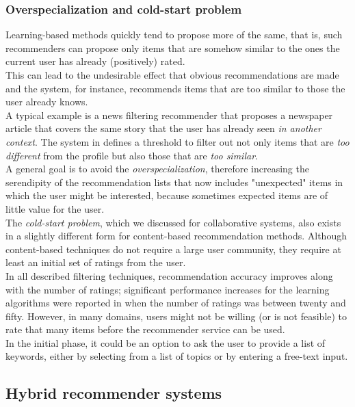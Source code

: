 \subsubsection{Overspecialization and cold-start problem}\label{overspecialization}

Learning-based methods quickly tend to propose more of the same, that
is, such recommenders can propose only items that are somehow similar
to the ones the current user has already (positively) rated. \\ This can
lead to the undesirable effect that obvious recommendations are made
and the system, for instance, recommends items that are too similar to
those the user already knows.\\ A typical example is a news filtering
recommender that proposes a newspaper article that covers the same
story that the user has already seen \textit{in another context}. The
system in \cite{billsus1999personal} defines a threshold to filter
out not only items that are \textit{too different} from the profile
but also those that are \textit{too similar}. \\A general goal is to
avoid the \textit{overspecialization}, therefore increasing the
serendipity of the recommendation lists that now includes "unexpected"
items in which the user might be interested, because sometimes
expected items are of little value for the user.\\ 
The  \textit{cold-start problem}, 
which we discussed for collaborative systems,  also
exists in a slightly different form for content-based recommendation
methods. Although content-based techniques do not require a large user
community, they require at least an initial set of ratings from the
user. \\ In all described filtering techniques, recommendation
accuracy improves along with the number of ratings; significant
performance increases for the learning algorithms were reported in
 \cite{pazzani1997learning}   when the number of ratings was between
twenty and fifty. However, in many domains, users might not be
willing (or is not feasible) to rate that many items before the
recommender  service can be used. \\In the initial phase, it could be an
option to ask  the user to provide a list of keywords, either by
selecting from a  list of topics or by entering a free-text input.

\subsection{Hybrid recommender systems} 

